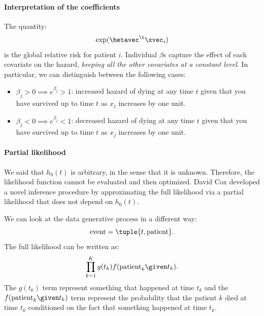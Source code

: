 \paragraph{Interpretation of the coefficients}

The quantity:
\begin{equation}
    \exp(\betavec^\t\xvec_i)
\end{equation}
is the global relative risk for patient $i$. Individual $\beta$s capture the effect of each covariate on the hazard, \emph{keeping all the other covariates at a constant level}. In particular, we can distinguish between the following cases:
\begin{itemize}
    \item $\beta_j > 0 \implies e^{\beta_j} > 1$: increased hazard of dying at any time $t$ given that you have survived up to time $t$ as $x_j$ increases by one unit.
    \item $\beta_j < 0 \implies e^{\beta_j} < 1$: decreased hazard of dying at any time $t$ given that you have survived up to time $t$ as $x_j$ increases by one unit.
\end{itemize}

\paragraph{Partial likelihood} We said that $h_0(t)$ is arbitrary, in the sense that it is unknown. Therefore, the likelihood function cannot be evaluated and then optimized. David Cox developed a novel inference procedure by approximating the full likelihood via a partial likelihood that does not depend on $h_0(t)$.

We can look at the data generative process in a different way:
\begin{equation}
    \text{event} = \tuple{t, \text{patient}}.
\end{equation}
The full likelihood can be written as:
\begin{equation}
    \prod_{k = 1}^K g(t_k)f(\text{patient}_k \given t_k).
\end{equation}
The $g(t_k)$ term represent something that happened at time $t_k$ and the $f(\text{patient}_k \given t_k)$ term represent the probability that the patient $k$ died at time $t_k$ conditioned on the fact that something happened at time $t_k$.

